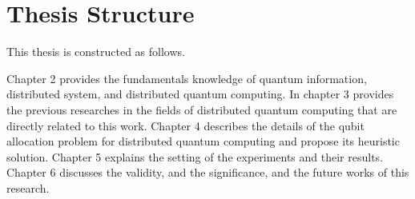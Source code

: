 \section{Thesis Structure}
\label{introduction:thesis_structure}
This thesis is constructed as follows.

Chapter 2 provides the fundamentals knowledge of quantum information, distributed system, and distributed quantum computing.
In chapter 3 provides the previous researches in the fields of distributed quantum computing that are directly related to this work.
Chapter 4 describes the details of the qubit allocation problem for distributed quantum computing and propose its heuristic solution.
Chapter 5 explains the setting of the experiments and their results.
Chapter 6 discusses the validity, and the significance, and the future works of this research.


